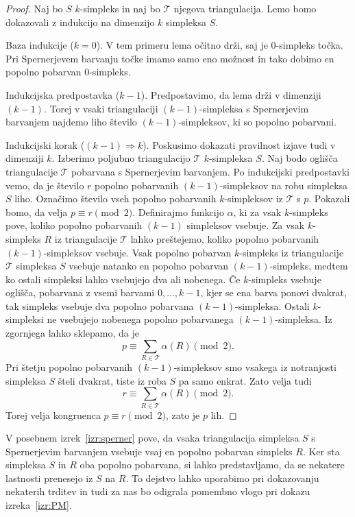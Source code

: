 \documentclass[mat1]{fmfdelo}
\newcommand{\0}{\underline{0}}
\newcommand{\pT}{\mathcal T}
\begin{document}
\begin{proof}
Naj bo $S$ $k$-simpleks in naj bo $\pT$ njegova triangulacija. Lemo bomo dokazovali z indukcijo na dimenzijo $k$ simpleksa $S$.

Baza indukcije ($k = 0$).
V tem primeru lema očitno drži, saj je $0$-simpleks točka. Pri Spernerjevem barvanju točke imamo samo eno možnost in tako dobimo en popolno pobarvan $0$-simpleks.

Indukcijska predpostavka ($k - 1$).
Predpostavimo, da lema drži v dimenziji $(k - 1)$. Torej v vsaki triangulaciji $(k - 1)$-simpleksa s Spernerjevim barvanjem najdemo liho število $(k - 1)$-simpleksov, ki so popolno pobarvani.

Indukcijski korak ($(k - 1) \Longrightarrow k$).
Poskusimo dokazati pravilnost izjave tudi v dimenziji $k$. Izberimo poljubno triangulacijo $\pT$ $k$-simpleksa $S$. Naj bodo oglišča triangulacije $\pT$ pobarvana s Spernerjevim barvanjem. Po indukcijski predpostavki vemo, da je število $r$ popolno pobarvanih $(k-1)$-simpleksov na robu simpleksa $S$ liho. Označimo število vseh popolno pobarvanih $k$-simpleksov iz $\pT$ s $p$. Pokazali bomo, da velja $p \equiv r \pmod 2$.
Definirajmo funkcijo $\alpha$, ki za vsak $k$-simpleks pove, koliko popolno pobarvanih $(k-1)$ simpleksov vsebuje. Za vsak $k$-simpleks $R$ iz triangulacije $\pT$ lahko preštejemo, koliko popolno pobarvanih $(k-1)$-simpleksov vsebuje. Vsak popolno pobarvan $k$-simpleks iz triangulacije $\pT$ simpleksa $S$ vsebuje natanko en popolno pobarvan $(k-1)$-simpleks, medtem ko ostali simpleksi lahko vsebujejo dva ali nobenega. Če $k$-simpleks vsebuje oglišča, pobarvana z vsemi barvami $0, \dots, k-1$, kjer se ena barva ponovi dvakrat, tak simpleks vsebuje dva popolno pobarvana $(k-1)$-simpleksa. Ostali $k$-simpleksi ne vsebujejo nobenega popolno pobarvanega $(k - 1)$-simpleksa. Iz zgornjega lahko sklepamo, da je 
$$p \equiv \sum\limits_{R \in \pT} \alpha(R) \pmod 2.$$
Pri štetju popolno pobarvanih $(k - 1)$-simpleksov smo vsakega iz notranjosti simpleksa $S$ šteli dvakrat, tiste iz roba $S$ pa samo enkrat. Zato velja tudi 
$$r \equiv \sum\limits_{R \in \pT} \alpha(R) \pmod 2.$$ 
Torej velja kongruenca $p \equiv r \pmod 2$, zato je $p$ lih.
\end{proof}
V posebnem izrek~\ref{izr:sperner} pove, da vsaka triangulacija simpleksa $S$ s Spernerjevim barvanjem vsebuje vsaj en popolno pobarvan simpleks $R$. Ker sta simpleksa $S$ in $R$ oba popolno pobarvana, si lahko predstavljamo, da se nekatere lastnosti prenesejo iz $S$ na $R$. To dejstvo lahko uporabimo pri dokazovanju nekaterih trditev in tudi za nas bo odigrala pomembno vlogo pri dokazu izreka~\ref{izr:PM}. 
\end{document}
